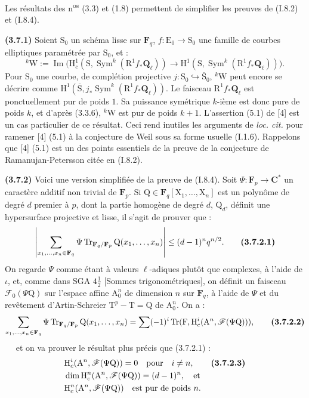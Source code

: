 \documentclass[11pt,leqno]{article}
\newcommand{\Page}[1]{\ifvmode\noindent\else\unskip\ \fi{\footnotesize\textcolor{gray}{[p.\,#1]}}\ \ignorespaces}
\begin{document}
Les résultats des n\textsuperscript{os} (3.3) et (1.8) permettent de simplifier les preuves de (I.8.2) et (I.8.4).

\textbf{(3.7.1)} Soient \(\mathrm S_0\) un schéma lisse sur \(\mathbf F_q\), \(f:\mathrm E_0\to\mathrm S_0\) une famille de courbes elliptiques paramétrée par \(\mathrm S_0\), et :
\[
{}^k\mathrm W:=\operatorname{Im}\bigl(
\mathrm H_c^1(\mathrm S,\operatorname{Sym}^k(\mathrm R^1f_*\mathbf Q_\ell))
\to\mathrm H^1(\mathrm S,\operatorname{Sym}^k(\mathrm R^1f_*\mathbf Q_\ell))
\bigr).
\]
Pour \(\mathrm S_0\) une courbe, de complétion projective \(j:\mathrm S_0\hookrightarrow\overline{\mathrm S}_0\), \({}^k\mathrm W\) peut encore se décrire comme \(\mathrm H^1(\overline{\mathrm S},j_*\operatorname{Sym}^k(\mathrm R^1f_*\mathbf Q_\ell))\). Le faisceau \(\mathrm R^1f_*\mathbf Q_\ell\) est ponctuellement pur de poids \(1\). Sa puissance symétrique \(k\)-ième est donc pure de poids \(k\), et d’après (3.3.6), \({}^k\mathrm W\) est pur de poids \(k+1\). L’assertion (5.1) de [4] est un cas particulier de ce résultat. Ceci rend inutiles les arguments de \textit{loc. cit.} pour ramener [4] (5.1) à la conjecture de Weil sous sa forme usuelle (I.1.6). Rappelons que [4] (5.1) est un des points essentiels de la preuve de la conjecture de Ramanujan-Petersson citée en (I.8.2).

\textbf{(3.7.2)} Voici une version simplifiée de la preuve de (I.8.4). Soit \(\Psi:\mathbf F_p\to\mathbf C^*\) un caractère additif non trivial de \(\mathbf F_p\). Si \(\mathrm Q\in\mathbf F_q[\mathrm X_1,\ldots,\mathrm X_n]\) est un polynôme de degré \(d\) premier à \(p\), dont la partie homogène de degré \(d\), \(\mathrm Q_d\), définit une hypersurface projective et lisse, il s’agit de prouver que :
\[
\left|
\sum_{x_1,\ldots,x_n\in\mathbf F_q}
\Psi\operatorname{Tr}_{\mathbf F_q/\mathbf F_p}\mathrm Q(x_1,\ldots,x_n)
\right|
\leq(d-1)^nq^{n/2}.
\tag*{\textbf{(3.7.2.1)}}
\]
On regarde \(\Psi\) comme étant à valeurs \(\ell\)-adiques plutôt que complexes, à l’aide de \(\iota\), et, comme dans SGA \(4\frac{1}{2}\) [Sommes trigonométriques], on définit un faisceau \(\mathscr F_0(\Psi\mathrm Q)\) sur l’espace affine \(\mathrm A_0^n\) de dimension \(n\) sur \(\mathbf F_q\), à l’aide de \(\Psi\) et du revêtement d’Artin-Schreier \(\mathrm T^p-\mathrm T=\mathrm Q\) de \(\mathrm A_0^n\). On a :
\[
\sum_{x_1,\ldots,x_n\in\mathbf F_q}
\Psi\operatorname{Tr}_{\mathbf F_q/\mathbf F_p}\mathrm Q(x_1,\ldots,x_n)
=
\sum(-1)^i\operatorname{Tr}(\mathrm F,\mathrm H_c^i(\mathrm A^n,\mathscr F(\Psi\mathrm Q))),
\tag*{\textbf{(3.7.2.2)}}
\]
\Page{216}
et on va prouver le résultat plus précis que (3.7.2.1) :
\begin{align*}
&\mathrm H_c^i(\mathrm A^n,\mathscr F(\Psi\mathrm Q))=0
\quad\text{pour}\quad i\ne n,
\tag*{\textbf{(3.7.2.3)}}\\
&\dim\mathrm H_c^n(\mathrm A^n,\mathscr F(\Psi\mathrm Q))=(d-1)^n,
\quad\text{et}\\
&\mathrm H_c^n(\mathrm A^n,\mathscr F(\Psi\mathrm Q))
\quad\text{est pur de poids }n.
\end{align*}
\end{document}
